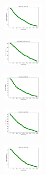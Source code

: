\begin{figure}[H]
    \begin{subfigure}
        \centering
        \includegraphics[width=0.234\textwidth]{img/ageun/rand_set_const_20_277451237_cost.png}
    \end{subfigure}
    \hfill
    \begin{subfigure}
        \centering
        \includegraphics[width=0.234\textwidth]{img/ageun/newthyroid_set_const_20_277451237_cost.png}
    \end{subfigure}
    \hfill
    \begin{subfigure}
        \centering
        \includegraphics[width=0.234\textwidth]{img/ageun/iris_set_const_20_49258669_cost.png}
    \end{subfigure}
    \hfill
    \begin{subfigure}
        \centering
        \includegraphics[width=0.234\textwidth]{img/ageun/ecoli_set_const_20_49258669_cost.png}
    \end{subfigure}
    \hfill
    \begin{subfigure}
        \centering
        \includegraphics[width=0.234\textwidth]{img/ageun/rand_set_const_20_49258669_cost.png}
    \end{subfigure}
    \hfill
    \begin{subfigure}
        \centering

\end{subfigure}
\end{figure}
